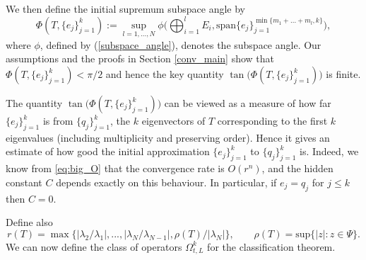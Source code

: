 \documentclass[a4paper,10pt]{article}
\begin{document}
\begin{itemize}
We then define the initial supremum subspace angle by
\begin{equation}
\label{sup_subspace_angle}
\Phi(T,\{e_j\}_{j=1}^k):=\sup_{l=1,...,N}\phi\Big(\bigoplus_{i=1}^lE_i,\mathrm{span}\{ e_{j}\}_{j=1}^{\min\{m_1+...+m_{l},k\}}\Big),
\end{equation}
where $\phi$, defined by (\ref{subspace_angle}), denotes the subspace angle. Our assumptions and the proofs in Section \ref{conv_main} show that $\Phi(T,\{e_j\}_{j=1}^k)<\pi/2$ and hence the key quantity $\tan\big(\Phi(T,\{e_j\}_{j=1}^k)\big)$ is finite.
\end{itemize}

\begin{remark}
The quantity $\tan\big(\Phi(T,\{e_j\}_{j=1}^k)\big)$ can be viewed as a measure of how far $\{e_j\}_{j=1}^k$ is from $\{q_j\}_{j=1}^k$, the $k$ eigenvectors of $T$ corresponding to the first $k$ eigenvalues (including multiplicity and preserving order). Hence it gives an estimate of how good the initial approximation $\{e_j\}_{j=1}^k$ to $\{q_j\}_{j=1}^k$ is. Indeed, we know from \eqref{eq:big_O} that the convergence rate is $O(r^n)$, and the hidden constant $C$ depends exactly on this behaviour. In particular, if $e_j = q_j$ for $j \leq k$ then $C = 0$.
\end{remark}

Define also
\[
r(T)=\max\{\left|\lambda_2/\lambda_1\right|,...,\left|\lambda_{N}/\lambda_{N-1}\right|,\rho(T)/\left|\lambda_{N}\right|\}, \qquad \rho(T)=\mathrm{sup}\{\left|z\right|:z\in\Psi\}.
\]
We can now define the class of operators $\Omega^k_{t,L}$ for the classification theorem. 
\end{document}
